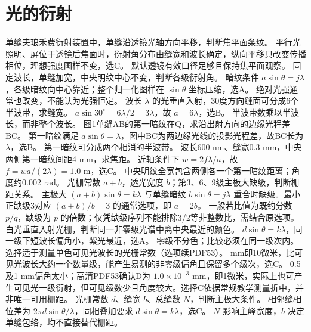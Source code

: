 \section{光的衍射}
\problemtext 单缝夫琅禾费衍射装置中，单缝沿透镜光轴方向平移，判断焦平面条纹。
\workings 平行光照明、屏位于透镜后焦面时，衍射角分布由缝宽和波长确定，纵向平移只改变传播相位，理想强度图样不变，选C。
\crosscheck 默认透镜有效口径足够且保持焦平面观察。
\problemtext 固定波长，单缝加宽，中央明纹中心不变，判断各级衍射角。
\workings 暗纹条件 $a\sin\theta=j\lambda$，各级暗纹向中心靠近；整个归一化图样在 $\sin\theta$ 坐标压缩，选A。
\crosscheck 绝对光强通常也改变，不能认为光强恒定。
\problemtext 波长 $\lambda$ 的光垂直入射，30度方向缝面可分成6个半波带，求缝宽。
\workings $a\sin30^\circ=6\lambda/2=3\lambda$，故 $a=6\lambda$，选B。
\crosscheck 半波带数乘以半波长，而非整个波长。
\problemtext 图1单缝AB的第一暗纹在Q，求沿出射方向的边缘光程差BC。
\workings 第一暗纹满足 $a\sin\theta=\lambda$，图中BC为两边缘光线的投影光程差，故BC长为 $\lambda$，选B。
\crosscheck 第一暗纹可分成两个相消的半波带。
\problemtext 波长600 nm、缝宽0.3 mm，中央两侧第一暗纹间距4 mm，求焦距。
\workings 近轴条件下 $w=2f\lambda/a$，故 $f=wa/(2\lambda)=1.0$ m，选C。
\crosscheck 中央明纹全宽包含两侧各一个第一暗纹距离；角度约0.002 rad。
\problemtext 光栅常数 $a+b$，透光宽度 $b$；第3、6、9级主极大缺级，判断栅距关系。
\workings 主极大 $(a+b)\sin\theta=k\lambda$ 与单缝暗纹 $b\sin\theta=j\lambda$ 重合时缺级。最小正缺级3对应 $(a+b)/b=3$ 的通常选项，即 $a=2b$。
\crosscheck 一般若比值为既约分数 $p/q$，缺级为 $p$ 的倍数；仅凭缺级序列不能排除3/2等非整数比，需结合原选项。
\problemtext 白光垂直入射光栅，判断同一非零级光谱中离中央最近的颜色。
\workings $d\sin\theta=k\lambda$，同一级下短波长偏角小，紫光最近，选A。
\crosscheck 零级不分色；比较必须在同一级次内。
\problemtext 选择适于测量单色可见光波长的光栅常数（选项续PDF53）。
 mm即10微米，比可见光波长大约一个数量级，能产生易测的非零级偏角且保留多个级次，选C。
\crosscheck 0.5及1 mm偏角太小；高清PDF53确认D为 $1.0\times10^{-3}$ mm，即1微米，实际上也可产生可见光一级衍射，但可见级数少且角度较大。选择C依据常规教学测量折中，并非唯一可用栅距。
\problemtext 光栅常数 $d$、缝宽 $b$、总缝数 $N$，判断主极大条件。
\workings 相邻缝相位差为 $2\pi d\sin\theta/\lambda$，同相叠加要求 $d\sin\theta=k\lambda$，选C。
\crosscheck $N$ 影响主峰宽度，$b$ 决定单缝包络，均不直接替代栅距。
